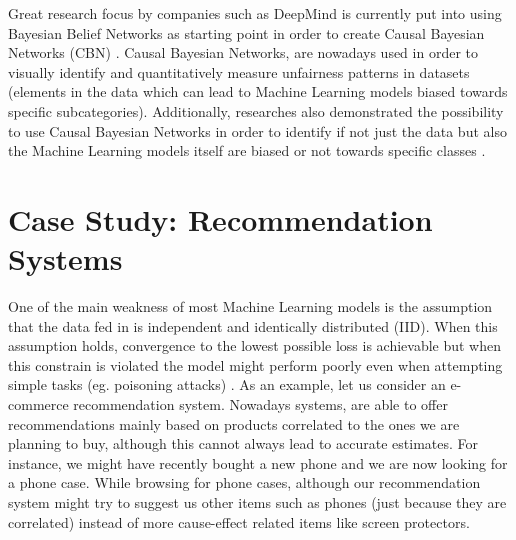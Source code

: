 Great research focus by companies such as DeepMind is currently put into using Bayesian Belief Networks as starting point in order to create Causal Bayesian Networks (CBN) \cite{deep}. Causal Bayesian Networks, are nowadays used in order to visually identify and quantitatively measure unfairness patterns in datasets (elements in the data which can lead to Machine Learning models biased towards specific subcategories). Additionally, researches also demonstrated the possibility to use Causal Bayesian Networks in order to identify if not just the data but also the Machine Learning models itself are biased or not towards specific classes \cite{deep2}.

\section{Case Study: Recommendation Systems}

One of the main weakness of most Machine Learning models is the assumption that the data fed in is independent and identically distributed (IID). When this assumption holds, convergence to the lowest possible loss is achievable but when this constrain is violated the model might perform poorly even when attempting simple tasks (eg. poisoning attacks) \cite{six}.
As an example, let us consider an e-commerce recommendation system. Nowadays systems, are able to offer recommendations mainly based on products correlated to the ones we are planning to buy, although this cannot always lead to accurate estimates. For instance, we might have recently bought a new phone and we are now looking for a phone case. While browsing for phone cases, although our recommendation system might try to suggest us other items such as phones (just because they are correlated) instead of more cause-effect related items like screen protectors.



